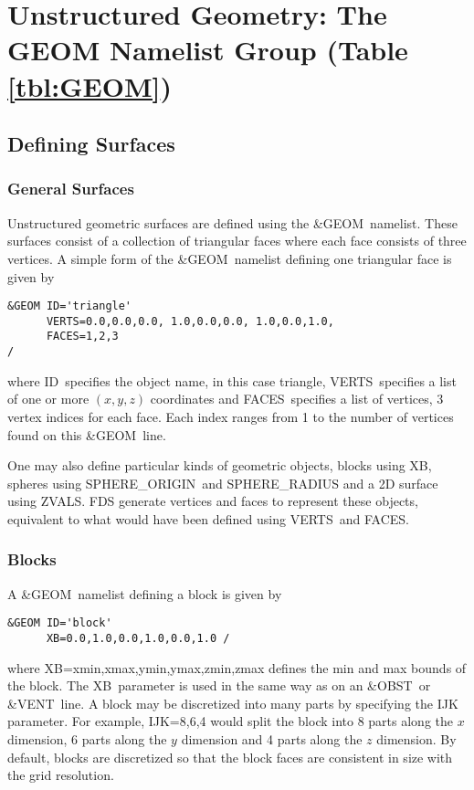\documentclass[12pt]{article}
\begin{document}



\vspace{1.0in}
\section{Unstructured Geometry: The \texorpdfstring{{\ct GEOM}}{GEOM} Namelist Group (Table \ref{tbl:GEOM})}
\label{info:GEOM}
\subsection{Defining Surfaces}

\subsubsection{General Surfaces}
Unstructured geometric surfaces are defined using the {\ct \&GEOM}\ namelist.
These surfaces consist of a collection of triangular faces where each face consists of three vertices.
A simple form of the {\ct \&GEOM}\ namelist defining one triangular face is given by

\begin{verbatim}
&GEOM ID='triangle'
      VERTS=0.0,0.0,0.0, 1.0,0.0,0.0, 1.0,0.0,1.0,
      FACES=1,2,3
/
\end{verbatim}

\noindent where {\ct ID}\ specifies the object name, in this case {\ct triangle},
{\ct VERTS}\ specifies a list of one or more $(x,y,z)$ coordinates and {\ct FACES}\ specifies a list of vertices, 3 vertex indices for each
face. Each index ranges from 1 to the number of vertices found on this {\ct \&GEOM}\ line.

One may also define particular kinds of geometric objects,  blocks using {\ct XB}, spheres using {\ct SPHERE\_ORIGIN}\ and {\ct SPHERE\_RADIUS}
and a 2D surface using {\ct ZVALS}.
FDS generate vertices and faces to represent these objects, equivalent to what would have been defined using {\ct VERTS}\ and {\ct FACES}.

\subsubsection{Blocks}
A {\ct \&GEOM}\ namelist defining a block is given by

\begin{verbatim}
&GEOM ID='block'
      XB=0.0,1.0,0.0,1.0,0.0,1.0 /
\end{verbatim}

\noindent where {\ct XB=xmin,xmax,ymin,ymax,zmin,zmax} defines the min and max bounds of the block.
The {\ct XB}\ parameter is used in the same way as on an {\ct \&OBST}\ or {\ct \&VENT}\ line.
A block may be discretized into many parts by
specifying the {\ct IJK} parameter.  For example, {\ct IJK=8,6,4} would split the block
into 8 parts along the $x$ dimension, 6 parts along the $y$ dimension and 4 parts along
the $z$ dimension. By default, blocks are discretized
so that the block faces are consistent in size with the grid resolution.
\end{document}
